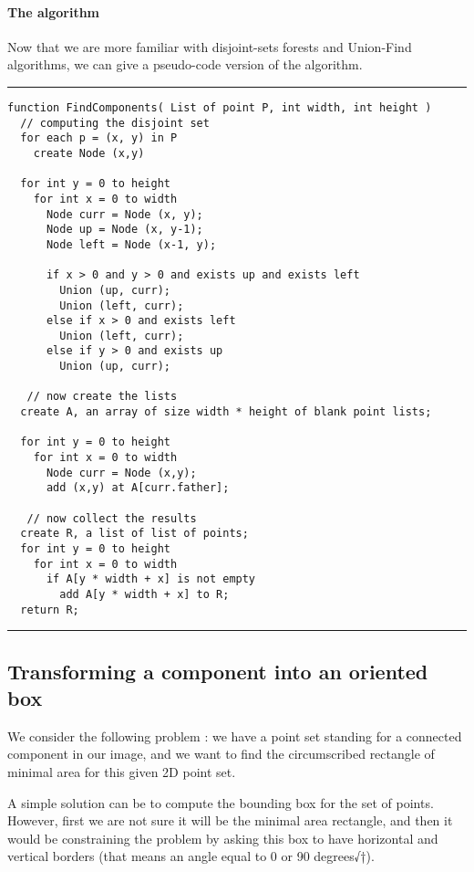 \documentclass{article}
\begin{document}
\paragraph{The algorithm} Now that we are more familiar with disjoint-sets forests and Union-Find algorithms, we can give a pseudo-code version of the algorithm.
\pagebreak
\hrule
\begin{verbatim}
function FindComponents( List of point P, int width, int height )
  // computing the disjoint set
  for each p = (x, y) in P
    create Node (x,y)

  for int y = 0 to height
    for int x = 0 to width
      Node curr = Node (x, y);
      Node up = Node (x, y-1);
      Node left = Node (x-1, y);

      if x > 0 and y > 0 and exists up and exists left
        Union (up, curr);
        Union (left, curr);
      else if x > 0 and exists left
        Union (left, curr);
      else if y > 0 and exists up
        Union (up, curr);

   // now create the lists
  create A, an array of size width * height of blank point lists;

  for int y = 0 to height
    for int x = 0 to width
      Node curr = Node (x,y);
      add (x,y) at A[curr.father];

   // now collect the results
  create R, a list of list of points;
  for int y = 0 to height
    for int x = 0 to width
      if A[y * width + x] is not empty
        add A[y * width + x] to R;
  return R;
\end{verbatim}
\hrule\vspace*{.5 cm}


        \subsection{Transforming a component into an oriented box}

We consider the following problem :
we have a point set standing for a connected component in our image,
and we want to find the circumscribed rectangle of minimal area for this given 2D point set.

A simple solution can be to compute the bounding box for the set of points.
However, first we are not sure it will be the minimal area rectangle,
and then it would be constraining the problem by asking this box to have
horizontal and vertical borders (that means an angle equal to 0 or 90 degrees√†).
\end{document}
